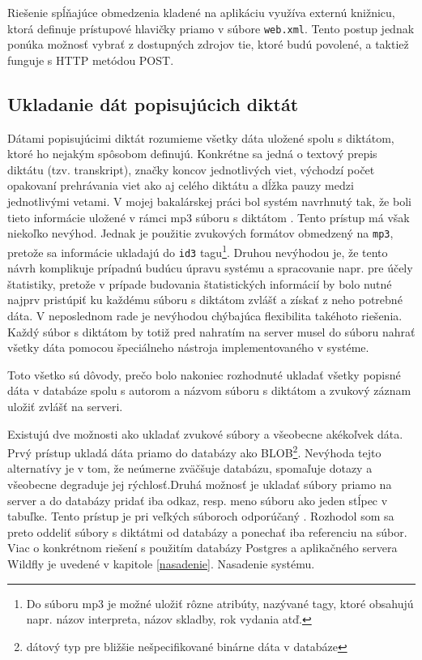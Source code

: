 \documentclass[12pt,oneside]{fithesis2}
\begin{document}
      		\par Riešenie spĺňajúce obmedzenia kladené na aplikáciu využíva externú knižnicu\cite{dzhuvinov15}, ktorá definuje prístupové hlavičky priamo v súbore \texttt{web.xml}. Tento postup jednak ponúka možnosť vybrať z dostupných zdrojov tie, ktoré budú povolené, a taktiež funguje s HTTP metódou POST\cite{sof2}.

		\subsection{Ukladanie dát popisujúcich diktát} \label{ukladanie}
	\par Dátami popisujúcimi diktát rozumieme všetky dáta uložené spolu s diktátom, ktoré ho nejakým spôsobom definujú. Konkrétne sa jedná o textový prepis diktátu (tzv. transkript), značky koncov jednotlivých viet, východzí počet opakovaní prehrávania viet ako aj celého diktátu a dĺžka pauzy medzi jednotlivými vetami. V mojej bakalárskej práci bol systém navrhnutý tak, že boli tieto informácie uložené v rámci mp3 súboru s diktátom \cite{rumanov12}. Tento prístup má však niekoľko nevýhod. Jednak je použitie zvukových formátov obmedzený na \texttt{mp3}, pretože sa informácie ukladajú do \texttt{id3} tagu\footnote{Do súboru mp3 je možné uložiť rôzne atribúty, nazývané tagy, ktoré obsahujú napr. názov interpreta, názov skladby, rok vydania atď.}. Druhou nevýhodou je, že tento návrh komplikuje prípadnú budúcu úpravu systému a spracovanie napr. pre účely štatistiky, pretože v prípade budovania štatistických informácií by bolo nutné najprv pristúpiť ku každému súboru s diktátom zvlášť a získať z neho potrebné dáta. V neposlednom rade je nevýhodou chýbajúca flexibilita takéhoto riešenia. Každý súbor s diktátom by totiž pred nahratím na server musel do súboru nahrať všetky dáta pomocou špeciálneho nástroja implementovaného v systéme.
	\par Toto všetko sú dôvody, prečo bolo nakoniec rozhodnuté ukladať všetky popisné dáta v databáze spolu s autorom a názvom súboru s diktátom a zvukový záznam uložiť zvlášť na serveri. 
      \par Existujú dve možnosti ako ukladať zvukové súbory a všeobecne akékoľvek dáta. Prvý prístup ukladá dáta priamo do databázy ako BLOB\footnote{dátový typ pre bližšie nešpecifikované binárne dáta v databáze}. Nevýhoda tejto alternatívy je v tom, že neúmerne zväčšuje databázu, spomaľuje dotazy a všeobecne degraduje jej rýchlosť.Druhá možnosť je ukladať súbory priamo na server a do databázy pridať iba odkaz, resp. meno súboru ako jeden stĺpec v tabuľke. Tento prístup je pri veľkých súboroch odporúčaný \cite{sof1}. Rozhodol som sa preto oddeliť súbory s diktátmi od databázy a ponechať iba referenciu na súbor. Viac o konkrétnom riešení s použitím databázy Postgres a aplikačného servera Wildfly je uvedené v kapitole \ref{nasadenie}. Nasadenie systému.
      
\end{document}
